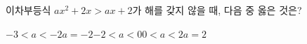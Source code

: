 이차부등식 $ax^2+2x>ax+2$가 해를 갖지 않을 때, 다음 중 옳은 것은? 
\begin{choices32}{$-3<a<-2$}{$a=-2$}{$-2<a<0$}{$0<a<2$}{$a=2$}\end{choices32}
